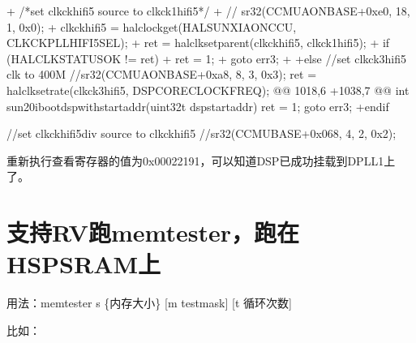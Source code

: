 \documentclass[letterpaper,10pt,english]{sphinxmanual}
\begin{document}
\begin{sphinxVerbatim}[commandchars=\\\{\}]
+       /*set clk\PYGZus{}ck\PYGZus{}hifi5 source to clk\PYGZus{}ck1\PYGZus{}hifi5*/
+    // sr32(CCMU\PYGZus{}AON\PYGZus{}BASE+0xe0, 18, 1, 0x0);
+    clk\PYGZus{}ck\PYGZus{}hifi5 = hal\PYGZus{}clock\PYGZus{}get(HAL\PYGZus{}SUNXI\PYGZus{}AON\PYGZus{}CCU, CLK\PYGZus{}CKPLL\PYGZus{}HIFI5\PYGZus{}SEL);
+    ret = hal\PYGZus{}clk\PYGZus{}set\PYGZus{}parent(clk\PYGZus{}ck\PYGZus{}hifi5, clk\PYGZus{}ck1\PYGZus{}hifi5);
+    if (HAL\PYGZus{}CLK\PYGZus{}STATUS\PYGZus{}OK != ret) \PYGZob{}
+        ret = \PYGZhy{}1;
+        goto err3;
+    \PYGZcb{}
+\PYGZsh{}else
     //set clk\PYGZus{}ck3\PYGZus{}hifi5 clk to 400M
     //sr32(CCMU\PYGZus{}AON\PYGZus{}BASE+0xa8,  8, 3, 0x3);
     ret = hal\PYGZus{}clk\PYGZus{}set\PYGZus{}rate(clk\PYGZus{}ck3\PYGZus{}hifi5, DSP\PYGZus{}CORE\PYGZus{}CLOCK\PYGZus{}FREQ);
@@ \PYGZhy{}1018,6 +1038,7 @@ int \PYGZus{}\PYGZus{}sun20i\PYGZus{}boot\PYGZus{}dsp\PYGZus{}with\PYGZus{}start\PYGZus{}addr(uint32\PYGZus{}t dsp\PYGZus{}start\PYGZus{}addr)
         ret = \PYGZhy{}1;
         goto err3;
     \PYGZcb{}
+\PYGZsh{}endif

     //set clk\PYGZus{}ck\PYGZus{}hifi5\PYGZus{}div source to clk\PYGZus{}ck\PYGZus{}hifi5
     //sr32(CCMU\PYGZus{}BASE+0x068, 4, 2, 0x2);
\end{sphinxVerbatim}

\sphinxAtStartPar
重新执行查看寄存器的值为0x00022191，可以知道DSP已成功挂载到DPLL1上了。


\section{支持RV跑memtester，跑在HS\sphinxhyphen{}PSRAM上}
\label{\detokenize{r128_u9a8c_u8bc1_u56fa_u4ef6/r128_u9a8c_u8bc1_u56fa_u4ef6_u5f00_u53d1_u6307_u5357:rvmemtester-hs-psram}}
\sphinxAtStartPar
{}

\sphinxAtStartPar
用法：memtester \sphinxhyphen{}s \{内存大小\} {[}\sphinxhyphen{}m testmask{]} {[}\sphinxhyphen{}t 循环次数{]}

\sphinxAtStartPar
比如：
\end{document}
